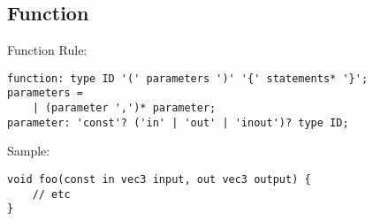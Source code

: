 \subsection{Function}

\begin{frame}[fragile]{Function}
    Rule:
    \begin{lstlisting}
function: type ID '(' parameters ')' '{' statements* '}';
parameters =
    | (parameter ',')* parameter;
parameter: 'const'? ('in' | 'out' | 'inout')? type ID;
    \end{lstlisting}
    Sample:
    \begin{lstlisting}
void foo(const in vec3 input, out vec3 output) {
    // etc
}
    \end{lstlisting}
\end{frame}